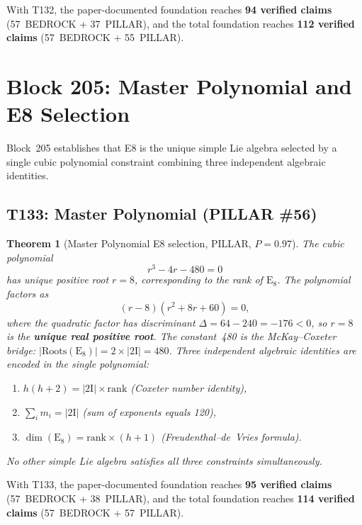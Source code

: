 \documentclass[aps,prd,twocolumn,superscriptaddress,floatfix,nofootinbib]{revtex4-2}
\newtheorem{theorem}{Theorem}
\theoremstyle{definition}
\theoremstyle{remark}
\begin{document}
\noindent
With T132, the paper-documented foundation reaches \textbf{94 verified claims}
(57~BEDROCK + 37~PILLAR), and the total foundation reaches \textbf{112 verified claims}
(57~BEDROCK + 55~PILLAR).

\section{Block 205: Master Polynomial and E8 Selection}
\label{sec:block205}

Block~205 establishes that E8 is the unique simple Lie algebra selected by a
single cubic polynomial constraint combining three independent algebraic identities.

\subsection{T133: Master Polynomial (PILLAR \#56)}
\label{sec:t133-master-poly}

\begin{theorem}[Master Polynomial E8 selection, PILLAR, $P{=}0.97$]
\label{thm:t133}
The cubic polynomial
\begin{equation}
r^3 - 4r - 480 = 0
\end{equation}
has unique positive root $r=8$, corresponding to the rank of $\mathrm{E}_8$.
The polynomial factors as
\begin{equation}
(r-8)(r^2 + 8r + 60) = 0,
\end{equation}
where the quadratic factor has discriminant $\Delta = 64 - 240 = -176 < 0$,
so $r=8$ is the \textbf{unique real positive root}.  The constant~480 is the
McKay--Coxeter bridge: $|\mathrm{Roots}(\mathrm{E}_8)| = 2\times|\mathrm{2I}| = 480$.
Three independent algebraic identities are encoded in the single polynomial:
\begin{enumerate}
\item $h(h+2) = |\mathrm{2I}|\times\mathrm{rank}$ (Coxeter number identity),
\item $\sum_i m_i = |\mathrm{2I}|$ (sum of exponents equals 120),
\item $\dim(\mathrm{E}_8) = \mathrm{rank}\times(h+1)$ (Freudenthal--de~Vries formula).
\end{enumerate}
No other simple Lie algebra satisfies all three constraints simultaneously.
\end{theorem}

\noindent
With T133, the paper-documented foundation reaches \textbf{95 verified claims}
(57~BEDROCK + 38~PILLAR), and the total foundation reaches \textbf{114 verified claims}
(57~BEDROCK + 57~PILLAR).
\end{document}

